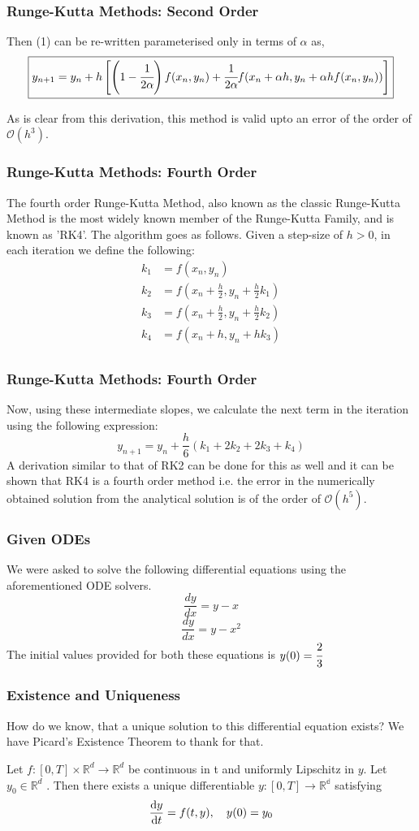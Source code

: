 \documentclass{beamer}
\newcommand{\bigO}{\mathcal{O}}
\begin{document}
\begin{frame}
    \frametitle{Runge-Kutta Methods: Second Order}
    Then (1) can be re-written parameterised only in terms of $\alpha$ as,
    $$\boxed{y_{n+1} = y_n + h\left[\left(1 - \cfrac{1}{2\alpha}\right)f(x_n, y_n) + \cfrac{1}{2\alpha}f(x_n + \alpha h, y_n + \alpha hf(x_n, y_n))\right]}$$

    As is clear from this derivation, this method is valid upto an error of the order of $\bigO(h^3)$.
\end{frame}
\begin{frame}
    \frametitle{Runge-Kutta Methods: Fourth Order}
    The fourth order Runge-Kutta Method, also known as the classic Runge-Kutta Method is the most widely known member of the Runge-Kutta Family, and is known as 'RK4'. The algorithm goes as follows. Given a step-size of $h > 0$, in each iteration we define the following:
    \begin{align*}
        k_1 &= f(x_n, y_n) \\    
        k_2 &= f\left(x_n + \frac{h}{2}, y_n + \frac{h}{2}k_1\right) \\
        k_3 &= f\left(x_n + \frac{h}{2}, y_n + \frac{h}{2}k_2\right) \\
        k_4 &= f\left(x_n + h, y_n + hk_3\right) \\
    \end{align*}
\end{frame}
\begin{frame}
    \frametitle{Runge-Kutta Methods: Fourth Order}
    Now, using these intermediate slopes, we calculate the next term in the iteration using the following expression:
    $$\boxed{y_{n + 1} = y_n + \frac{h}{6}(k_1 + 2k_2 + 2k_3 + k_4)}$$
A derivation similar to that of RK2 can be done for this as well and it can be shown that RK4 is a fourth order method i.e. the error in the numerically obtained solution from the analytical solution is of the order of $\mathcal{O}(h^5)$.
\end{frame}
\begin{frame}
    \frametitle{Given ODEs}
    We were asked to solve the following differential equations using the aforementioned ODE solvers.
    $$\frac{dy}{dx} = y - x$$
    $$\frac{dy}{dx} = y - x^2$$   
    The initial values provided for both these equations is $y(0) = \cfrac{2}{3}$
\end{frame}
\begin{frame}
    \frametitle{Existence and Uniqueness}
How do we know, that a unique solution to this differential equation exists? We have Picard's Existence Theorem to thank for that. 
\begin{theorem}
    \label{picard}
    Let $f : [0, T] \times \mathbb{R}^d \to \mathbb{R}^d$ be continuous in t and uniformly Lipschitz in $y$. Let $y_0 \in  \mathbb{R}^d$ . Then there exists a unique
differentiable $y : [0, T ] \to \mathbb{R^d}$ satisfying
$$\dv{y}{t} = f(t, y),~~~y(0) = y_0$$
\end{theorem}
\end{frame}
\end{document}
